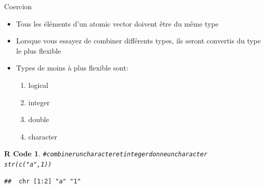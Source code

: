 \documentclass[11pt]{beamer}\usepackage[]{graphicx}\usepackage[]{color}
\makeatletter
\newcommand{\hlnum}[1]{\textcolor[rgb]{0.063,0.58,0.627}{#1}}%
\newcommand{\hlstr}[1]{\textcolor[rgb]{0.063,0.58,0.627}{#1}}%
\newcommand{\hlcom}[1]{\textcolor[rgb]{0.588,0.588,0.588}{#1}}%
\newcommand{\hlstd}[1]{\textcolor[rgb]{0.196,0.196,0.196}{#1}}%
\newcommand{\hlkwb}[1]{\textcolor[rgb]{0.627,0,0.314}{#1}}%
\newcommand{\hlkwd}[1]{\textcolor[rgb]{0.78,0.227,0.412}{#1}}%
\newenvironment{kframe}{%
 \def\at@end@of@kframe{}%
 \ifinner\ifhmode%
  \def\at@end@of@kframe{\end{minipage}}%
  \begin{minipage}{\columnwidth}%
 \fi\fi%
 \def\FrameCommand##1{\hskip\@totalleftmargin \hskip-\fboxsep
 \colorbox{shadecolor}{##1}\hskip-\fboxsep
     \hskip-\linewidth \hskip-\@totalleftmargin \hskip\columnwidth}%
 \MakeFramed {\advance\hsize-\width
   \@totalleftmargin\z@ \linewidth\hsize
   \@setminipage}}%
 {\par\unskip\endMakeFramed%
 \at@end@of@kframe}
\newenvironment{knitrout}{}{} %
\newtheorem{rcode}{R Code}[section]
\makeatother
\begin{document}

\begin{frame}[fragile]{Coercion}

\begin{itemize}
  \setlength\itemsep{1em}
\item Tous les éléments d'un atomic vector doivent être du même type
\pause \item Lorsque vous essayez de combiner différents types, ils seront convertis du type le plus flexible
\pause \item Types de moins à plus flexible sont:
\begin{enumerate}
\item logical 
\item integer 
\item double 
\item character
\end{enumerate}
\end{itemize}
\begin{knitrout}
\color{fgcolor}\begin{kframe}
\begin{rcode}\begin{alltt}
\hlcom{# combiner un character et integer donne un character}
\hlkwd{str}\hlstd{(}\hlkwd{c}\hlstd{(}\hlstr{"a"}\hlstd{,} \hlnum{1}\hlstd{))}
\end{alltt}
\begin{verbatim}
##  chr [1:2] "a" "1"
\end{verbatim}
\end{rcode}\end{kframe}
\end{knitrout}
\end{frame}
\end{document}
